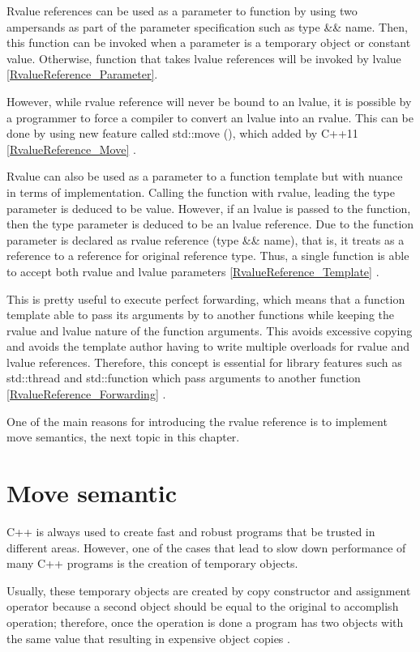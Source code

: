 \documentclass[11pt]{report}
\begin{document}
Rvalue references can be used as a parameter to function by using two ampersands as part of the parameter specification such as type \&\& name. Then, this function can be invoked when a parameter is a temporary object or constant value. Otherwise, function that takes lvalue references will be invoked by lvalue \ref{RvalueReference_Parameter}.


However, while rvalue reference will never be bound to an lvalue, it is possible by a programmer to force a compiler to convert an lvalue into an rvalue. This can be done by using new feature called std::move (), which added by C++11 \ref{RvalueReference_Move} \cite{Gregorie:professionalcpp}.


Rvalue can also be used as a parameter to a function template but with nuance in terms of implementation. Calling the function with rvalue, leading the type parameter is deduced to be value. However, if an lvalue is passed to the function, then the type parameter is deduced to be an lvalue reference. Due to the function parameter is declared as rvalue reference (type \&\& name), that is, it treats as a reference to a reference for original reference type. Thus, a single function is able to accept both rvalue and lvalue parameters \ref{RvalueReference_Template} \cite{Williams:2012:CCA}.


This is pretty useful to execute perfect forwarding, which means that a function template able to pass its arguments by to another functions while keeping the rvalue and lvalue nature of the function arguments.  This avoids excessive copying and avoids the template author having to write multiple overloads for rvalue and lvalue references. Therefore, this concept is essential for library features such as std::thread and std::function which pass arguments to another function \ref{RvalueReference_Forwarding} \cite{Williams:2012:CCA}.


One of the main reasons for introducing the rvalue reference is to implement move semantics, the next topic in this chapter.

\section{Move semantic}
\label{section: Move semantic}
C++ is always used to create fast and robust programs that be trusted in different areas.  However, one of the cases that lead to slow down performance of many C++ programs is the creation of temporary objects.


Usually, these temporary objects are created by copy constructor and assignment operator because a second object should be equal to the original to accomplish operation; therefore, once the operation is done a program has two objects with the same value that resulting in expensive object copies \cite{Stroustrup:2005:Cpp}.
\end{document}
